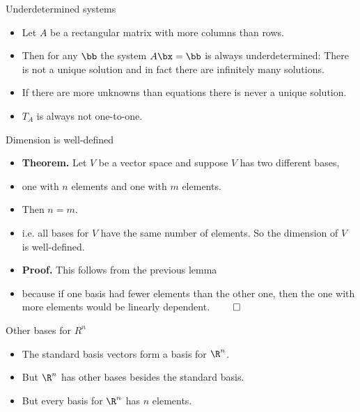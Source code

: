 \documentclass{beamer}
\begin{document}
\begin{frame}{Underdetermined systems}

\begin{itemize}
\item Let $A$ be a rectangular matrix with more columns than rows.
\item Then for any $\bb$ the system $A\bx=\bb$ is always underdetermined: There is not a unique solution and in fact there are infinitely many solutions.
\item If there are more unknowns than equations there is never a unique solution.
\item $T_A$ is always not one-to-one.
\end{itemize}

\end{frame}
\begin{frame}{Dimension is well-defined}

\begin{itemize}
\item \textbf{Theorem.} Let $V$ be a vector space and suppose $V$ has two different bases,
\item one with $n$ elements and one with $m$ elements.
\item Then $n=m$.
\item i.e. all bases for $V$ have the same number of elements. So the dimension of $V$ is well-defined.
\item \textbf{Proof.} This follows from the previous lemma
\item because if one basis had fewer
elements than the other one, then the one with more elements would be linearly dependent. $\qed$
\end{itemize}

\end{frame}

\begin{frame}{Other bases for $R^n$}

\begin{itemize}
\item The standard basis vectors form a basis for $\R^n$.
\item But $\R^n$ has other bases besides the standard basis.
\item But every basis for $\R^n$ has $n$ elements.
\end{itemize}

\end{frame}
\end{document}
